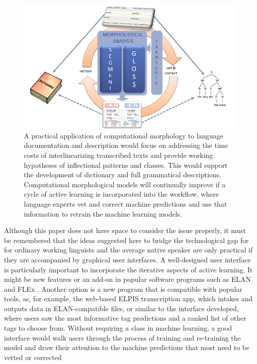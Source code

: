 \documentclass[12pt]{article}
\begin{document}
\begin{figure}[ht]
\label{fig:ML-LDD}
\begin{center}
\includegraphics[width=0.75\columnwidth]{ML-LDD.PNG}
\caption{A practical application of computational morphology to language documentation and description would focus on addressing the time costs of interlinearizing transcribed texts and provide working hypotheses of inflectional patterns and classes. This would support the development of dictionary and full grammatical descriptions. Computational morphological models will continually improve if a cycle of active learning is incorporated into the workflow, where language experts vet and correct machine predictions and use that information to retrain the machine learning models.}
\end{center}
\end{figure}

Although this paper does not have space to consider the issue properly, it must be remembered that the ideas suggested here to bridge the technological gap for for ordinary working linguists and the average native speaker are only practical if they are accompanied by graphical user interfaces. A well-designed user interface is particularly important to incorporate the iterative aspects of active learning. It might be new features or an add-on in popular software programs such as ELAN \cite{auer_elan_2010} and FLEx \cite{Black06FLEX}.  Another option is a new program that is compatible with popular tools, as, for example, the web-based ELPIS \cite{foley_elpis_2018} transcription app, which intakes and outputs data in ELAN-compatible files, or similar to the interface  developed, where users saw the most informative tag predictions and a ranked list of other tags to choose from. Without requiring a class in machine learning, a good interface would walk users through the process of training and re-training the model and draw their attention to the machine predictions that most need to be vetted or corrected
\end{document}
